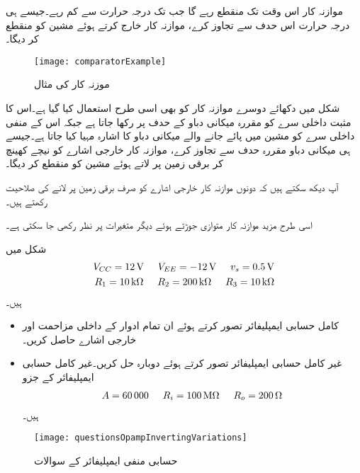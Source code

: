 موازنہ کار اس وقت تک منقطع رہے گا جب تک درجہ حرارت  سے کم رہے۔جیسے ہی درجہ حرارت اس حدف سے تجاوز کرے، موازنہ کار   خارج کرتے ہوئے مشین کو منقطع کر دیگا۔
\begin{figure}
\centering
\texttt{[image: comparatorExample]}
\caption{موزنہ کار کی مثال}
\label{شکل_حسابی_موازنہ_کار_مقررہ_حدف}
\end{figure}

شکل میں دکھائے دوسرے موازنہ کار کو بھی اسی طرح استعمال کیا گیا ہے۔اس کا مثبت داخلی سرے کو مقررہ میکانی دباو کے حدف پر رکھا جاتا ہے جبکہ اس کے منفی داخلی سرے  کو مشین میں پائے جانے والے میکانی دباو کا اشارہ مہیا کیا جاتا ہے۔جیسے ہی میکانی دباو مقررہ حدف سے تجاوز  کرے، موازنہ کار خارجی اشارے  کو نیچے کھینچ کر برقی زمین  پر لاتے ہوئے مشین کو منقطع کر دیگا۔

آپ دیکھ سکتے ہیں کہ دونوں موازنہ کار خارجی اشارے کو صرف برقی زمین پر لانے کی صلاحیت رکھتے ہیں۔

اسی طرح مزید موازنہ کار متوازی جوڑتے ہوئے دیگر متغیرات پر نظر رکھی جا سکتی ہے۔
\newpage
{}

شکل  میں
\begin{align*}
V_{CC}=\SI{12}{\volt} \hspace{5mm} V_{EE}=\SI{-12}{\volt} \hspace{5mm} v_s=\SI{0.5}{\volt}\\
R_1=\SI{10}{\kilo \ohm} \hspace {5mm} R_2=\SI{200}{\kilo \ohm} \hspace{5mm} R_3=\SI{10}{\kilo \ohm}
\end{align*}
ہیں۔
\begin{itemize}
\item
کامل حسابی ایمپلیفائر تصور کرتے ہوئے ان تمام ادوار کے داخلی مزاحمت اور خارجی اشارے  حاصل کریں۔
\item
غیر کامل حسابی ایمپلیفائر تصور کرتے ہوئے دوبارہ حل کریں۔غیر کامل حسابی ایمپلیفائر کے جزو
\begin{align*}
A=\num{60000} \hspace{5mm} R_i=\SI{100}{\mega \ohm} \hspace{5mm} R_o=\SI{200}{\ohm}
\end{align*}
ہیں۔
\end{itemize}
%
\begin{figure}
\centering
\texttt{[image: questionsOpampInvertingVariations]}
\caption{حسابی منفی ایمپلیفائر کے سوالات}
\label{شکل_حسابی_منفی_اقسام}
\end{figure}


